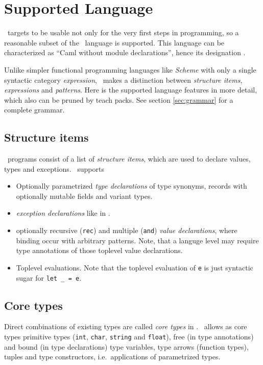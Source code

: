 
\section{Supported Language}
\label{sec:language}

\easyocaml\ targets to be usable not only for the very first steps in
programming, so a reasonable subset of the \ocaml\ language is supported.
This language can be characterized as ``Caml without module declarations'',
hence its designation \camlm.

Unlike simpler functional programming languages like \textit{Scheme} with only a single
syntactic category \emph{expression}, \ocaml\ makes a distinction between 
\emph{structure items}, \emph{expressions} and \emph{patterns}.
Here is the supported language features in more detail, which also can be
pruned by teach packs. See section \ref{sec:grammar} for a complete grammar.


\subsection*{Structure items}

\ocaml\ programs consist of a list of \emph{structure items}, which are used to
declare values, types and exceptions.
\easyocaml\ supports
\begin{itemize}
  \item Optionally parametrized \emph{type declarations} of type synonyms,
    records with optionally mutable fields and variant types.
  \item \emph{exception declarations} like in \ocaml.
  \item optionally recursive (\texttt{rec}) and multiple (\texttt{and})
    \emph{value declarations}, where binding occur with arbitrary patterns.
    Note, that a languge level may require type annotations of those toplevel
    value declarations.
  \item Toplevel evaluations. Note that the toplevel evaluation of \texttt{e} is just
    syntactic sugar for \texttt{let \_ = e}.
\end{itemize}

\subsection*{Core types}
Direct combinations of existing types are called \emph{core types} in \ocaml.
\easyocaml\ allows as core types primitive types (\texttt{int}, \texttt{char},
\texttt{string} and \texttt{float}), free (in type annotations) and bound (in
type declarations) type variables, type arrows (function types), tuples and
type constructors, i.e.\ applications of parametrized types.

